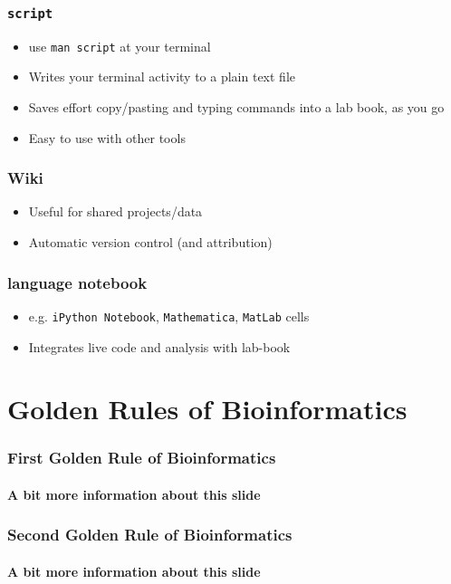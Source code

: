 \documentclass{beamer}
\begin{document}
   \begin{frame}
     \frametitle{\texttt{script}}
     \begin{itemize}
       \item use \texttt{man script} at your terminal
       \item Writes your terminal activity to a plain text file
       \item Saves effort copy/pasting and typing commands into a lab book, as you go
       \item Easy to use with other tools 
     \end{itemize}
   \end{frame}
   
   \begin{frame}
     \frametitle{Wiki}
     \begin{itemize}
       \item Useful for shared projects/data
       \item Automatic version control (and attribution)
     \end{itemize}
   \end{frame}
   
   \begin{frame}
     \frametitle{language notebook}
     \begin{itemize}
       \item e.g. \texttt{iPython Notebook}, \texttt{Mathematica}, \texttt{MatLab} cells
       \item Integrates live code and analysis with lab-book
     \end{itemize}
   \end{frame}


  \section{Golden Rules of Bioinformatics}
  \begin{frame}
    \frametitle{First Golden Rule of Bioinformatics}
    \framesubtitle{A bit more information about this slide}
  \end{frame}

  \begin{frame}
    \frametitle{Second Golden Rule of Bioinformatics}
    \framesubtitle{A bit more information about this slide}
  \end{frame}


\end{document}
